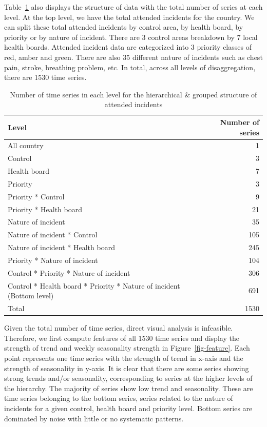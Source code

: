 \documentclass[
  authoryear,
  preprint,
  3p]{elsarticle}
\begin{document}
Table~\ref{tbl-hierarchy} also displays the structure of data with the
total number of series at each level. At the top level, we have the
total attended incidents for the country. We can split these total
attended incidents by control area, by health board, by priority or by
nature of incident. There are 3 control areas breakdown by 7 local
health boards. Attended incident data are categorized into 3 priority
classes of red, amber and green. There are also 35 different nature of
incidents such as chest pain, stroke, breathing problem, etc. In total,
across all levels of disaggregation, there are 1530 time series.

\hypertarget{tbl-hierarchy}{}
\begin{table}
\caption{\label{tbl-hierarchy}Number of time series in each level for the hierarchical \& grouped
structure of attended incidents }\tabularnewline

\centering
\begin{tabular}{lr}
\toprule
Level & Number of series\\
\midrule
All country & 1\\
Control & 3\\
Health board & 7\\
Priority & 3\\
Priority * Control & 9\\
\addlinespace
Priority * Health board & 21\\
Nature of incident & 35\\
Nature of incident * Control & 105\\
Nature of incident * Health board & 245\\
Priority * Nature of incident & 104\\
\addlinespace
Control * Priority * Nature of incident & 306\\
Control * Health board * Priority * Nature of incident (Bottom level) & 691\\
Total & 1530\\
\bottomrule
\end{tabular}
\end{table}

Given the total number of time series, direct visual analysis is
infeasible. Therefore, we first compute features of all 1530 time series
\citep{m3pca} and display the strength of trend and weekly seasonality
strength in Figure~\ref{fig-feature}. Each point represents one time
series with the strength of trend in x-axis and the strength of
seasonality in y-axis. It is clear that there are some series showing
strong trends and/or seasonality, corresponding to series at the higher
levels of the hierarchy. The majority of series show low trend and
seasonality. These are time series belonging to the bottom series,
series related to the nature of incidents for a given control, health
board and priority level. Bottom series are dominated by noise with
little or no systematic patterns.
\end{document}
